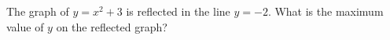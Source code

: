 The graph of $y=x^2+3$ is reflected in the line $y=-2$. What is the maximum value of $y$ on the reflected graph?
